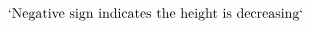 \documentclass[preview]{standalone}
\begin{document}
\begin{align*}
`\text{Negative sign indicates the height is decreasing}`
\end{align*}
\end{document}
